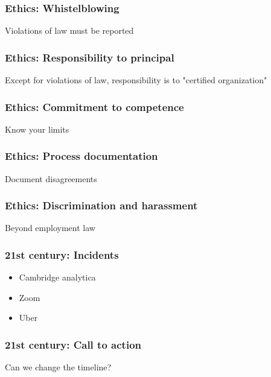 \begin{frame}[fragile]
\frametitle{Ethics: Whistelblowing}

Violations of law must be reported

\end{frame}

\begin{frame}[fragile]
\frametitle{Ethics: Responsibility to principal}

Except for violations of law,
responsibility is to "certified organization"

\end{frame}

\begin{frame}[fragile]
\frametitle{Ethics: Commitment to competence}

Know your limits

\end{frame}

\begin{frame}[fragile]
\frametitle{Ethics: Process documentation}

Document disagreements

\end{frame}

\begin{frame}[fragile]
\frametitle{Ethics: Discrimination and harassment}

Beyond employment law

\end{frame}

\begin{frame}[fragile]
\frametitle{21st century: Incidents}

\begin{itemize}
\item Cambridge analytica
\item Zoom
\item Uber
\end{itemize}

\end{frame}

\begin{frame}[fragile]
\frametitle{21st century: Call to action}

Can we change the timeline?

\end{frame}


